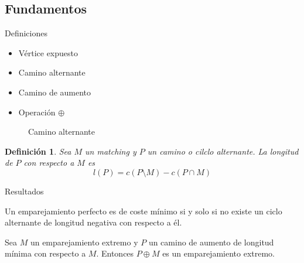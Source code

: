 \documentclass{beamer}
\newtheorem{defi}{Definici\'on}[section]
\begin{document}
\subsection{Fundamentos}
\begin{frame}{Definiciones}
\begin{itemize}
\item Vértice expuesto
\item Camino alternante
\item Camino de aumento
\item Operación $\oplus$
\end{itemize}

\begin{figure}[h!]
\centering
{}
\caption{Camino alternante}
\end{figure}

\end{frame}

\begin{frame}
\begin{defi}
Sea $M$ un matching y $P$ un camino o cilclo alternante. La longitud de $P$ con respecto a $M$ es
$$
l(P) = c(P\setminus M) - c(P\cap M)
$$
\end{defi}
\end{frame}

\begin{frame}{Resultados}


\begin{theorem}
Un emparejamiento perfecto es de coste mínimo si y solo si no existe un ciclo alternante de longitud negativa con respecto a él.
\end{theorem}


\begin{theorem}
Sea $M$ un emparejamiento extremo y $P$ un camino de aumento de longitud mínima con respecto a $M$. Entonces $P\oplus M$ es un emparejamiento extremo.
\end{theorem}
\end{frame}
\end{document}
